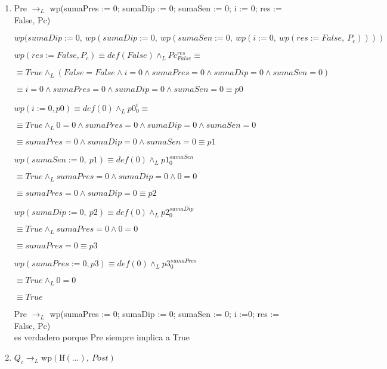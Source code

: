 \documentclass[10pt,a4paper]{article}
\begin{document}
\begin{enumerate}
    \item  Pre $\longrightarrow_{L}$ wp(sumaPres := 0; sumaDip := 0; sumaSen := 0; i := 0; res := False, Pc)
    \vspace{3mm} 

    $wp(sumaDip := 0, \: wp(sumaDip := 0, \: wp(sumaSen := 0, \: wp(i := 0, \: wp(res := False, \: P_c))))$

    \quad $wp(res := False, P_c) \equiv def(False) \land_L  Pc^{res}_{False} \equiv$

    \quad\quad $\equiv True \land_L (False = False \land i = 0 \land sumaPres = 0 \land sumaDip = 0 \land sumaSen = 0)$

    \quad\quad $\equiv i = 0 \land sumaPres = 0 \land sumaDip = 0 \land sumaSen = 0 \equiv p0$
    
    \quad $wp(i := 0, p0) \equiv def(0) \land_L  p0^i_0 \equiv$ 
    
    \quad\quad $\equiv True \land_L 0 = 0 \land sumaPres = 0 \land sumaDip = 0 \land sumaSen = 0 $

    \quad\quad $\equiv sumaPres = 0 \land sumaDip = 0 \land sumaSen = 0 \equiv p1$

    \quad $wp(sumaSen := 0, \: p1) \equiv def(0) \land_L p1^{sumaSen}_0$

    \quad\quad $\equiv True \land_L sumaPres = 0 \land sumaDip = 0 \land 0 = 0$

    \quad\quad $ \equiv sumaPres = 0 \land sumaDip = 0 \equiv p2$

    \quad $wp(sumaDip := 0, \: p2) \equiv def(0) \land_L p2^{sumaDip}_0$

    \quad\quad $\equiv True \land_L sumaPres = 0 \land 0 = 0$

    \quad\quad $\equiv sumaPres = 0 \equiv p3$

    \quad $wp(sumaPres := 0, p3) \equiv def(0) \land_L p3^{sumaPres}_0 $

    \quad\quad $\equiv True \land_L 0 = 0$  

    \quad\quad$ \equiv True $ 

\vspace{3mm} 
{Pre $\longrightarrow_{L}$ wp(sumaPres := 0; sumaDip := 0; sumaSen := 0; i :=0; res := False, Pc) \\ es verdadero porque Pre siempre implica a True }
\vspace{5mm} 

\item $Q_c \longrightarrow_{L} \text{wp}(\text{If}(\ldots), \: Post)$ 
\vspace{3mm}


\end{enumerate}
\end{document}
